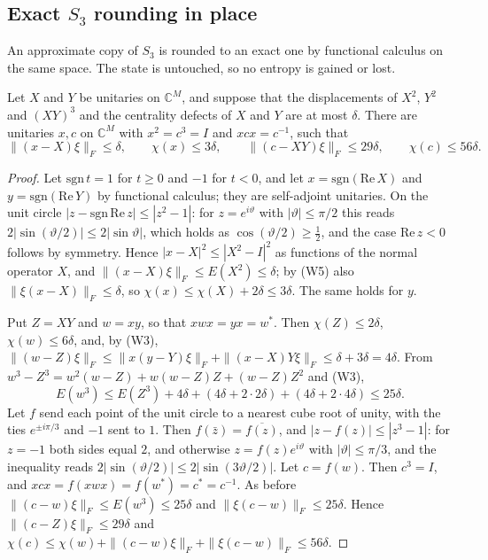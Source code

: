 \subsection{Exact \texorpdfstring{$S_3$}{S3} rounding in place}

An approximate copy of $S_3$ is rounded to an exact one by functional calculus on the same space. The state is untouched, so no entropy is
gained or lost.

\begin{lemma}\label{lem:rounding}
Let $X$ and $Y$ be unitaries on $\mathbb C^M$, and suppose that the displacements of $X^2$, $Y^2$ and $(XY)^3$ and the centrality defects of
$X$ and $Y$ are at most $\delta$. There are unitaries $x,c$ on $\mathbb C^M$ with $x^2=c^3=I$ and $xcx=c^{-1}$, such that
\[
\|(x-X)\xi\|_F\le\delta,\qquad\chi(x)\le3\delta,\qquad\|(c-XY)\xi\|_F\le29\delta,\qquad\chi(c)\le56\delta .
\]
\end{lemma}

\begin{proof}
Let $\mathrm{sgn}\,t=1$ for $t\ge0$ and $-1$ for $t<0$, and let $x=\mathrm{sgn}(\mathrm{Re}\,X)$ and $y=\mathrm{sgn}(\mathrm{Re}\,Y)$ by functional calculus;
they are self-adjoint unitaries. On the unit circle $|z-\mathrm{sgn}\,\mathrm{Re}\,z|\le|z^2-1|$: for $z=e^{i\vartheta}$ with $|\vartheta|\le\pi/2$ this reads
$2|\sin(\vartheta/2)|\le2|\sin\vartheta|$, which holds as $\cos(\vartheta/2)\ge\frac12$, and the case $\mathrm{Re}\,z<0$ follows by symmetry. Hence
$|x-X|^2\le|X^2-I|^2$ as functions of the normal operator $X$, and $\|(x-X)\xi\|_F\le E(X^2)\le\delta$; by (W5) also $\|\xi(x-X)\|_F\le\delta$, so
$\chi(x)\le\chi(X)+2\delta\le3\delta$. The same holds for $y$.

Put $Z=XY$ and $w=xy$, so that $xwx=yx=w^*$. Then $\chi(Z)\le2\delta$, $\chi(w)\le6\delta$, and, by (W3),
$\|(w-Z)\xi\|_F\le\|x(y-Y)\xi\|_F+\|(x-X)Y\xi\|_F\le\delta+3\delta=4\delta$. From $w^3-Z^3=w^2(w-Z)+w(w-Z)Z+(w-Z)Z^2$ and (W3),
\[
E(w^3)\le E(Z^3)+4\delta+(4\delta+2\cdot2\delta)+(4\delta+2\cdot4\delta)\le25\delta .
\]
Let $f$ send each point of the unit circle to a nearest cube root of unity, with the ties $e^{\pm i\pi/3}$ and $-1$ sent to $1$. Then
$f(\bar z)=\overline{f(z)}$, and $|z-f(z)|\le|z^3-1|$: for $z=-1$ both sides equal $2$, and otherwise $z=f(z)e^{i\vartheta}$ with
$|\vartheta|\le\pi/3$, and the inequality reads $2|\sin(\vartheta/2)|\le2|\sin(3\vartheta/2)|$. Let $c=f(w)$. Then $c^3=I$, and $xcx=f(xwx)=f(w^*)=c^*=c^{-1}$. As before
$\|(c-w)\xi\|_F\le E(w^3)\le25\delta$ and $\|\xi(c-w)\|_F\le25\delta$. Hence $\|(c-Z)\xi\|_F\le29\delta$ and
$\chi(c)\le\chi(w)+\|(c-w)\xi\|_F+\|\xi(c-w)\|_F\le56\delta$.
\end{proof}

